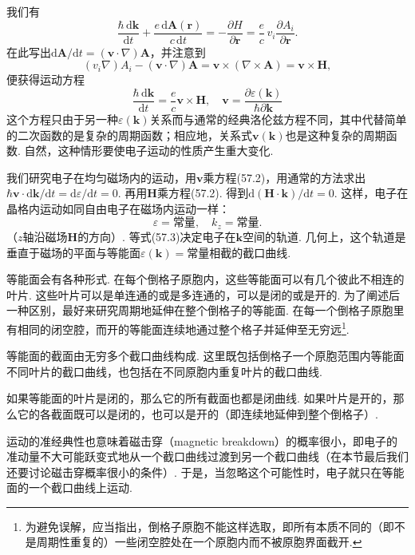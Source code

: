 我们有
\begin{equation*}
\frac{\hbar\,\mathrm d\bm k}{\mathrm dt}+\frac{e\,\mathrm d\bm A(\bm r)}{c\,\mathrm dt}
=-\frac{\partial H}{\partial\bm r}=\frac{e}{c}\,v_i\frac{\partial A_i}{\partial\bm r}.
\end{equation*}
在此写出$\mathrm d\bm A/\mathrm dt=(\bm v\cdot\nabla)\bm A$，并注意到
\begin{equation*}
(v_i\nabla)A_i-(\bm v\cdot\nabla)\bm A=\bm v\times(\nabla\times\bm A)=\bm v\times\bm H,
\end{equation*}
便获得运动方程
\begin{equation}
\frac{\hbar\,\mathrm d\bm k}{\mathrm dt}=\frac{e}{c}\bm v\times\bm H,\quad
\bm v=\frac{\partial\varepsilon(\bm k)}{\hbar\partial\bm k}
\label{57.2}
\end{equation}
这个方程只由于另一种$\varepsilon(\bm k)$关系而与通常的经典洛伦兹方程不同，其中代替简单的二次函数的是复杂的周期函数；相应地，关系式$\bm v(\bm k)$也是这种复杂的周期函数. 自然，这种情形要使电子运动的性质产生重大变化.

我们研究电子在均匀磁场内的运动，用$\bm v$乘方程(57.2)，用通常的方法求出$\hbar\bm v\cdot\mathrm d\bm k/\mathrm dt=\mathrm d\varepsilon/\mathrm dt=0$. 再用$\bm H$乘方程(57.2). 得到$\mathrm d(\bm H\cdot\bm k)/\mathrm dt=0$. 这样，电子在晶格内运动如同自由电子在磁场内运动一样：
\begin{equation}
\varepsilon=\text{常量},\quad k_z=\text{常量}.
\label{57.3}
\end{equation}
（$z$轴沿磁场$\bm H$的方向）. 等式(57.3)决定电子在$\bm k$空间的轨道. 几何上，这个轨道是垂直于磁场的平面与等能面$\varepsilon(\bm k)=$常量相截的截口曲线.

等能面会有各种形式. 在每个倒格子原胞内，这些等能面可以有几个彼此不相连的叶片. 这些叶片可以是单连通的或是多连通的，可以是闭的或是开的. 为了阐述后一种区别，最好来研究周期地延伸在整个倒格子的等能面. 在每一个倒格子原胞里有相同的闭空腔，而开的等能面连续地通过整个格子并延伸至无穷远\footnote{为避免误解，应当指出，倒格子原胞不能这样选取，即所有本质不同的（即不是周期性重复的）一些闭空腔处在一个原胞内而不被原胞界面截开.}.

等能面的截面由无穷多个截口曲线构成. 这里既包括倒格子一个原胞范围内等能面不同叶片的截口曲线，也包括在不同原胞内重复叶片的截口曲线.

如果等能面的叶片是闭的，那么它的所有截面也都是闭曲线. 如果叶片是开的，那么它的各截面既可以是闭的，也可以是开的（即连续地延伸到整个倒格子）.

运动的准经典性也意味着磁击穿（magnetic breakdown）的概率很小，即电子的准动量不大可能跃变式地从一个截口曲线过渡到另一个截口曲线（在本节最后我们还要讨论磁击穿概率很小的条件）. 于是，当忽略这个可能性时，电子就只在等能面的一个截口曲线上运动.

